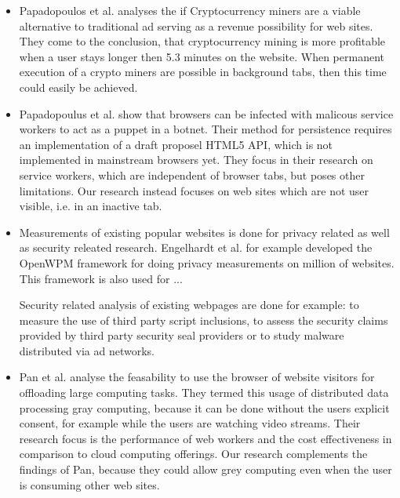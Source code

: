 \documentclass[
	ngerman,
	ruledheaders=section,%
	class=report,%
	thesis={type=bachelor},%
	accentcolor=9c,%
	custommargins=true,%
	marginpar=false,%
	parskip=half-,%
	fontsize=11pt,%
]{tudapub}
\begin{document}
  \begin{itemize}

  \item Papadopoulos et al.\autocite{papadopoulos2018truth} analyses the if Cryptocurrency miners are a viable alternative to traditional ad serving as a revenue possibility for web sites. They come to the conclusion, that cryptocurrency mining is more profitable when a user stays longer then 5.3 minutes on the website. When permanent execution of a crypto miners are possible in background tabs, then this time could easily be achieved.

  \item Papadopoulus et al.\cite{papadopoulos2018master} show that browsers can be infected with malicous service workers to act as a puppet in a botnet. Their method for persistence requires an implementation of a draft proposel HTML5 API, which is not implemented in mainstream browsers yet. They focus in their research on service workers, which are independent of browser tabs, but poses other limitations. Our research instead focuses on web sites which are not user visible, i.e. in an inactive tab.   

    
  \item Measurements of existing popular websites is done for privacy related as well as security releated research. Engelhardt et al.\cite{englehardt2016online} for example developed the OpenWPM framework for doing privacy measurements on million of websites. This framework is also used for ...

    Security related analysis of existing webpages are done for example: to measure the use of third party script inclusions\cite{nikiforakis2012you}, to assess the security claims provided by third party security seal providers\cite{van2014clubbing} or to study malware distributed via ad networks\cite{zarras2014dark}.


  \item Pan et al. analyse the feasability to use the browser of website visitors for offloading large computing tasks\cite{pan2015gray}. They termed this usage of distributed data processing gray computing, because it can be done without the users explicit consent, for example while the users are watching video streams. Their research focus is the performance of web workers and the cost effectiveness in comparison to cloud computing offerings. Our research complements the findings of Pan, because they could allow grey computing even when the user is consuming other web sites.

    
  \end{itemize}
\end{document}
